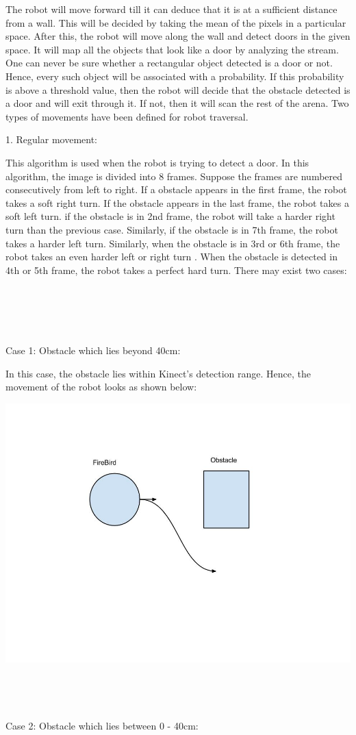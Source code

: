 \documentclass{report}
\begin{document}
The robot will move forward till it can deduce that it is at a sufficient distance from a wall. 
This will be decided by taking the mean of the pixels in a particular space. After this, the robot
will move along the wall and detect doors in the given space. It will map all the objects that look 
like a door by analyzing the stream. One can never be sure whether a rectangular object detected is a door or not. Hence, 
every such object will be associated with a probability. If this probability is above a threshold 
value, then the robot will decide that the obstacle detected is a door and will exit through it. 
If not, then it will scan the rest of the arena.
Two types of movements have been defined for robot traversal.

1. Regular movement:

This algorithm is used when the robot is trying to detect a door. In this algorithm, 
the image is divided into 8 frames. Suppose the frames are numbered consecutively from left to right. 
If a obstacle appears in the first frame, the robot takes a soft right turn. If the obstacle appears in the last frame, the robot takes
a soft left turn. if the obstacle is in 2nd frame, the robot will take a harder right turn than the previous case. Similarly, if the
obstacle is in 7th frame, the robot takes a harder left turn. Similarly, when the obstacle is in 3rd or 6th frame, the robot takes an
even harder left or right turn . When the obstacle is detected in 4th or 5th frame, the robot takes a perfect hard turn. There may exist two cases:
\\ \\ \\ \\ \\ \\
Case 1: Obstacle which lies beyond 40cm:

In this case, the obstacle lies within Kinect's detection range. Hence, the movement of the robot looks as shown below:

\includegraphics[width = 20CM]{Case_1.jpg}
\\ \\ \\ \\ \\
Case 2: Obstacle which lies between 0 - 40cm:
\end{document}
